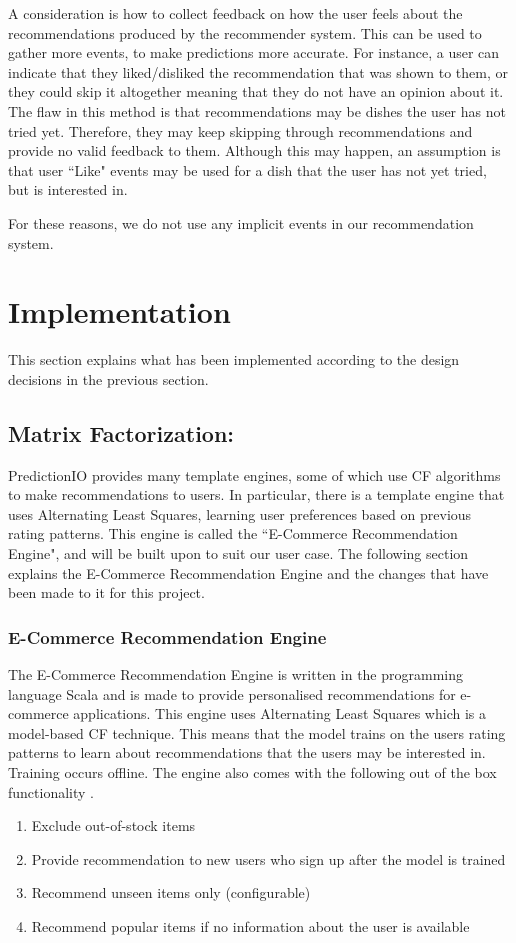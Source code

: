A consideration is how to collect feedback on how the user feels about the recommendations produced by the recommender system. This can be used to gather more events, to make predictions more accurate. For instance, a user can indicate that they liked/disliked the recommendation that was shown to them, or they could skip it altogether meaning that they do not have an opinion about it. The flaw in this method is that recommendations may be dishes the user has not tried yet. Therefore, they may keep skipping through recommendations and provide no valid feedback to them. Although this may happen, an assumption is that user ``Like" events may be used for a dish that the user has not yet tried, but is interested in. 

For these reasons, we do not use any implicit events in our recommendation system.

\section{Implementation}

This section explains what has been implemented according to the design decisions in the previous section.


\subsection{Matrix Factorization: }

PredictionIO \cite{predictionio} provides many template engines, some of which use CF algorithms to make recommendations to users. In particular, there is a template engine that uses Alternating Least Squares, learning user preferences based on previous rating patterns. This engine is called the ``E-Commerce Recommendation Engine", and will be built upon to suit our user case. The following section explains the E-Commerce Recommendation Engine and the changes that have been made to it for this project. 

\subsubsection{E-Commerce Recommendation Engine}

The E-Commerce Recommendation Engine is written in the programming language Scala and is made to provide personalised recommendations for e-commerce applications. This engine uses Alternating Least Squares which is a model-based CF technique. This means that the model trains on the users rating patterns to learn about recommendations that the users may be interested in. Training occurs offline. The engine also comes with the following out of the box functionality \cite{predictionio}.
\begin{enumerate}
 \item Exclude out-of-stock items
 \item Provide recommendation to new users who sign up after the model is trained
 \item Recommend unseen items only (configurable)
 \item Recommend popular items if no information about the user is available
\end{enumerate}

